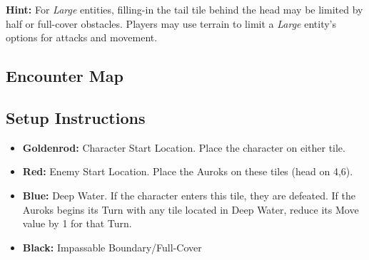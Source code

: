 \begin{tcolorbox}
\textbf{Hint:} For \emph{Large} entities, filling-in the tail tile behind the head may be limited by half or full-cover obstacles. Players may use terrain to limit a \emph{Large} entity’s options for attacks and movement.
\end{tcolorbox}

\pagebreak

\subsection*{Encounter Map}
\begin{center}
\end{center}

\subsection*{Setup Instructions}
\begin{itemize}
\item \textbf{Goldenrod:} Character Start Location. Place the character on either tile.
\item \textbf{Red:} Enemy Start Location. Place the Auroks on these tiles (head on 4,6).
\item \textbf{Blue:} Deep Water. If the character enters this tile, they are defeated. If the Auroks begins its Turn with any tile located in Deep Water, reduce its Move value by 1 for that Turn.
\item \textbf{Black:} Impassable Boundary/Full-Cover
\end{itemize}

